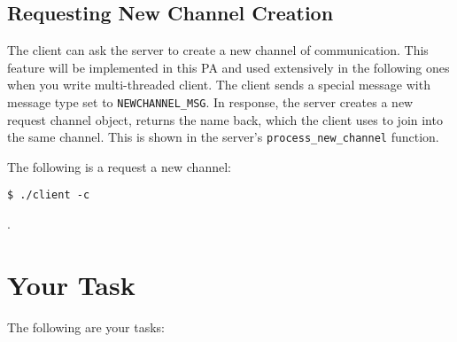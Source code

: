 \documentclass[12pt]{article}
\begin{document}
\subsection*{Requesting New Channel Creation}
The client can ask the server to create a new channel of communication. This feature will be implemented in this PA and used extensively in the following ones when you write multi-threaded client. The client sends a special message with message type set to \texttt{NEWCHANNEL\_MSG}. In response, the server creates a new request channel object, returns the name back, which the client uses to join into the same channel. This is shown in the server's \texttt{process\_new\_channel} function.

The following is a request a new channel:
\begin{lstlisting}[style=bash]
	$ ./client -c
  \end{lstlisting}.


\section*{Your Task}
The following are your tasks:
\end{document}
